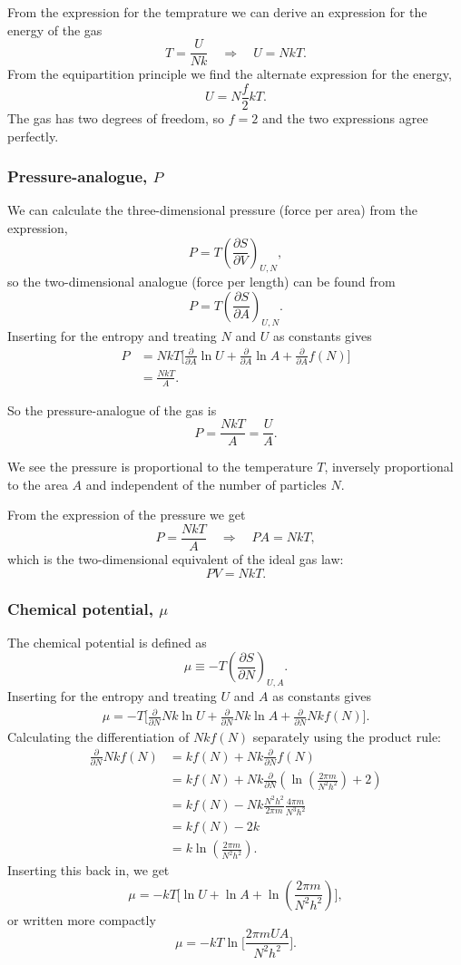 \documentclass[a4paper, 11pt, titlepage, english]{article}
\begin{document}
From the expression for the temprature we can derive an expression for the energy of the gas
$$T = \frac{U}{Nk} \quad \Rightarrow \quad U = NkT.$$
From the equipartition principle we find the alternate expression for the energy,
$$U = N\frac{f}{2}kT.$$
The gas has two degrees of freedom, so $f=2$ and the two expressions agree perfectly.

\subsubsection*{Pressure-analogue, $P$}
We can calculate the three-dimensional pressure (force per area) from the expression,
$$P = T\left(\frac{\partial S}{\partial V} \right)_{U,N},$$
so the two-dimensional analogue (force per length) can be found from
$$P = T\left(\frac{\partial S}{\partial A} \right)_{U,N}.$$
Inserting for the entropy and treating $N$ and $U$ as constants gives
\begin{align*}
P &= NkT\bigg[\frac{\partial }{\partial A}\ln U + \frac{\partial }{\partial A}\ln A + \frac{\partial }{\partial A}f(N) \bigg] \\
&= \frac{NkT}{A}.
\end{align*}

So the pressure-analogue of the gas is
$$P = \frac{NkT}{A} = \frac{U}{A}.$$

We see the pressure is proportional to the temperature $T$, inversely proportional to the area $A$ and independent of the number of particles $N$.

From the expression of the pressure we get
$$P = \frac{NkT}{A} \quad \Rightarrow \quad PA = NkT,$$
which is the two-dimensional equivalent of the ideal gas law:
$$PV = NkT.$$

\subsubsection*{Chemical potential, $\mu$}
The chemical potential is defined as
$$\mu \equiv -T\left(\frac{\partial S}{\partial N}\right)_{U,A}.$$
Inserting for the entropy and treating $U$ and $A$ as constants gives
\begin{align*}
\mu = -T\bigg[ \frac{\partial}{\partial N} Nk\ln U + \frac{\partial}{\partial N} Nk\ln A + \frac{\partial}{\partial N} Nk f(N)\bigg].
\end{align*}
Calculating the differentiation of $Nkf(N)$ separately using the product rule:
\begin{align*}
\frac{\partial}{\partial N} Nk f(N) &= kf(N) + Nk\frac{\partial}{\partial N}f(N) \\ 
&= kf(N) + Nk\frac{\partial}{\partial N}\left(\ln\left(\frac{2\pi m}{N^2 h^2}\right) + 2\right) \\
&= kf(N) - Nk\frac{N^2h^2}{2\pi m}\frac{4\pi m}{N^3h^2} \\
&= kf(N) - 2k \\
&= k\ln\left(\frac{2\pi m}{N^2 h^2}\right).
\end{align*}
Inserting this back in, we get
$$\mu = -kT\bigg[\ln U + \ln A + \ln\left(\frac{2\pi m}{N^2 h^2}\right)\bigg],$$
or written more compactly
$$\mu = -kT \ln \bigg[\frac{2\pi mUA}{N^2 h^2}\bigg].$$
\end{document}

